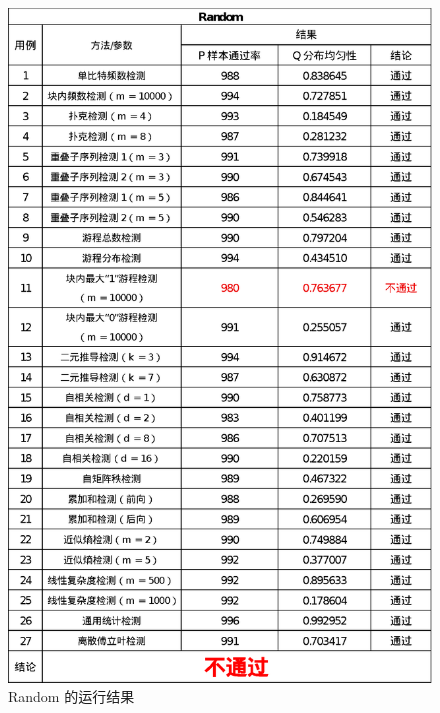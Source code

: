 \documentclass[12pt,a4paper]{article}%
\begin{document}
    \begin{figure}[h]
        \centering
        \begin{minipage}{0.42\textwidth}
            \centering
            \includegraphics[width=\linewidth]{Random}
            \caption{Random 的运行结果}
            \label{fig:img4}
        \end{minipage}\hfill
        \begin{minipage}{0.42\textwidth}
            \centering

\end{minipage}
\end{figure}
\end{document}
